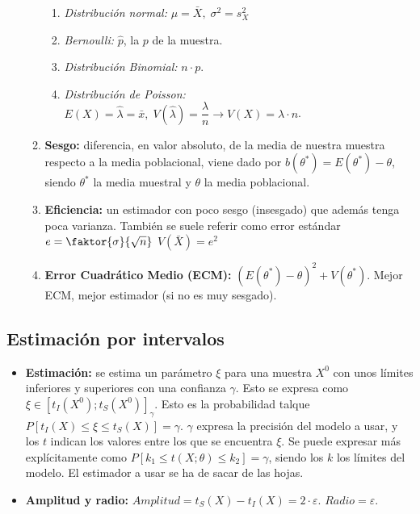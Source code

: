 \documentclass[a4paper, twocolumn, 10pt]{article}
\begin{document}
\begin{itemize}
\begin{enumerate}
		\begin{enumerate}
			\item \textit{Distribución normal:} $\mu = \bar{X}, \; \sigma^2 = s_X^2$
			\item \textit{Bernoulli:} $\hat{p}$, la $p$ de la muestra. 
			\item \textit{Distribución Binomial:} $n\cdot p$. 
			\item \textit{Distribución de Poisson:} $E(X) = \hat{\lambda} = \bar{x}, \; V(\hat{\lambda}) = \dfrac{\lambda}{n} \rightarrow V(X) = \lambda\cdot n$.
		\end{enumerate}
		\item \textbf{Sesgo:} diferencia, en valor absoluto, de la media de nuestra muestra respecto a la media poblacional, viene dado por $b(\theta^\ast) = E(\theta^\ast) - \theta$, siendo $\theta^\ast$ la media muestral y $\theta$ la media poblacional.
		\item \textbf{Eficiencia:} un estimador con poco sesgo (insesgado) que además tenga poca varianza. También se suele referir como error estándar $ e= \faktor{\sigma}{\sqrt{n}}$ $V(\bar{X}) = e^2$
		\item \textbf{Error Cuadrático Medio (ECM):} $\left(E(\theta^\ast)-\theta\right)^2 + V(\theta^\ast).$ Mejor ECM, mejor estimador (si no es muy sesgado). 
	\end{enumerate}
\end{itemize}

\subsection{Estimación por intervalos}

\begin{itemize}
	\item \textbf{Estimación:} se estima un parámetro $\xi$ para una muestra $X^0$ con unos límites inferiores y superiores con una confianza $\gamma$. Esto se expresa como $\xi \in \left[t_I(X^0); t_S(X^0)\right]_\gamma$. Esto es la probabilidad talque $P\left[t_I(X)\leq \xi \leq t_S(X)\right] = \gamma$. $\gamma$ expresa la precisión del modelo a usar, y los $t$ indican los valores entre los que se encuentra $\xi$. Se puede expresar más explícitamente como $P\left[k_1\leq t(X;\theta)\leq k_2\right] = \gamma$, siendo los $k$ los límites del modelo. El estimador a usar se ha de sacar de las hojas.
	\item \textbf{Amplitud y radio:} $Amplitud = t_S(X) -t_I(X) = 2\cdot \varepsilon$. $Radio = \varepsilon$.
\end{itemize}
\end{document}
